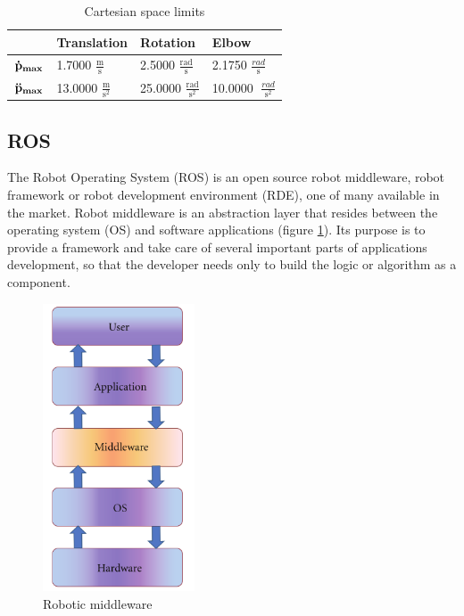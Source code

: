 \begin{table}[H]
    \caption[Cartesian space limits]{
        Cartesian space limits \cite{FrankaEmikaPanda}
    }
    \begin{center}
        \centering
        \begin{tabular}{|l|l|l|l|}
        \hline
             & \bf{Translation} & \bf{Rotation} & \bf{Elbow} \\ \hline \hline
            \(\bf{\dot{p}_{max}}\) & 1.7000 \(\frac{\text{m}}{\text{s}}\) & 2.5000 \(\frac{\text{rad}}{\text{s}}\) & 2.1750 \(\frac{rad}{\text{s}}\) \\ \hline
            \(\bf{\ddot{p}_{max}}\) & 13.0000 \(\frac{\text{m}}{\text{s}^2}\) & 25.0000 \(\frac{\text{rad}}{\text{s}^2}\) & 10.0000 \(\;\frac{rad}{\text{s}^2}\) \\ \hline
        \end{tabular}
    \end{center}
\label{t:cartesianlimits}
\end{table}

\subsection{ROS}
The Robot Operating System (ROS) is an open source robot middleware, robot framework or robot development environment (RDE), one of many available in the market. Robot middleware \cite{elkady2009middlew} is an abstraction layer that resides between the operating system (OS) and software applications (figure \ref{fig:middleware}). Its purpose is to provide a framework and  take care of several important parts of applications development, so that the developer needs only to build the logic or algorithm as a component.

\begin{figure}[H]
    \caption[Robotic middleware]{
        Robotic middleware \cite{elkady2009middlew}
    }
    \begin{center}
    \includegraphics[width=45mm]{figs/middleware.png}
    \end{center}
\label{fig:middleware}
\end{figure}


